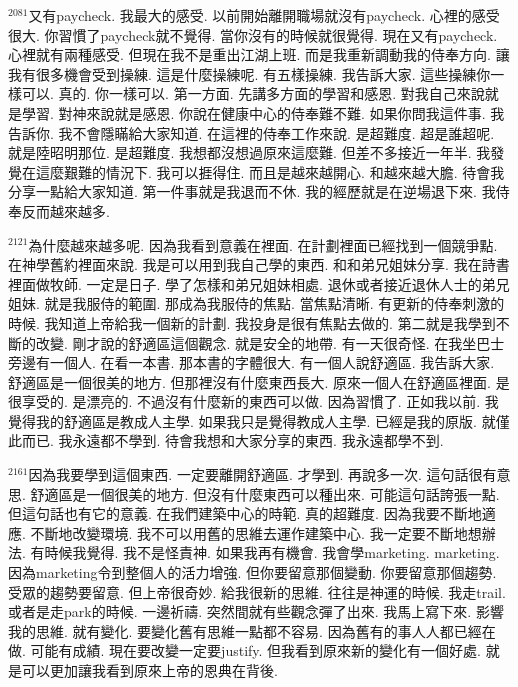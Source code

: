 \documentclass{book}
\begin{document}
$^{2081}$又有paycheck.
我最大的感受.
以前開始離開職場就沒有paycheck.
心裡的感受很大.
你習慣了paycheck就不覺得.
當你沒有的時候就很覺得.
現在又有paycheck.
心裡就有兩種感受.
但現在我不是重出江湖上班.
而是我重新調動我的侍奉方向.
讓我有很多機會受到操練.
這是什麼操練呢.
有五樣操練.
我告訴大家.
這些操練你一樣可以.
真的.
你一樣可以.
第一方面.
先講多方面的學習和感恩.
對我自己來說就是學習.
對神來說就是感恩.
你說在健康中心的侍奉難不難.
如果你問我這件事.
我告訴你.
我不會隱瞞給大家知道.
在這裡的侍奉工作來說.
是超難度.
超是誰超呢.
就是陸昭明那位.
是超難度.
我想都沒想過原來這麼難.
但差不多接近一年半.
我發覺在這麼艱難的情況下.
我可以捱得住.
而且是越來越開心.
和越來越大膽.
待會我分享一點給大家知道.
第一件事就是我退而不休.
我的經歷就是在逆場退下來.
我侍奉反而越來越多.

$^{2121}$為什麼越來越多呢.
因為我看到意義在裡面.
在計劃裡面已經找到一個競爭點.
在神學舊約裡面來說.
我是可以用到我自己學的東西.
和和弟兄姐妹分享.
我在詩書裡面做牧師.
一定是日子.
學了怎樣和弟兄姐妹相處.
退休或者接近退休人士的弟兄姐妹.
就是我服侍的範圍.
那成為我服侍的焦點.
當焦點清晰.
有更新的侍奉刺激的時候.
我知道上帝給我一個新的計劃.
我投身是很有焦點去做的.
第二就是我學到不斷的改變.
剛才說的舒適區這個觀念.
就是安全的地帶.
有一天很奇怪.
在我坐巴士旁邊有一個人.
在看一本書.
那本書的字體很大.
有一個人說舒適區.
我告訴大家.
舒適區是一個很美的地方.
但那裡沒有什麼東西長大.
原來一個人在舒適區裡面.
是很享受的.
是漂亮的.
不過沒有什麼新的東西可以做.
因為習慣了.
正如我以前.
我覺得我的舒適區是教成人主學.
如果我只是覺得教成人主學.
已經是我的原版.
就僅此而已.
我永遠都不學到.
待會我想和大家分享的東西.
我永遠都學不到.

$^{2161}$因為我要學到這個東西.
一定要離開舒適區.
才學到.
再說多一次.
這句話很有意思.
舒適區是一個很美的地方.
但沒有什麼東西可以種出來.
可能這句話誇張一點.
但這句話也有它的意義.
在我們建築中心的時範.
真的超難度.
因為我要不斷地適應.
不斷地改變環境.
我不可以用舊的思維去運作建築中心.
我一定要不斷地想辦法.
有時候我覺得.
我不是怪責神.
如果我再有機會.
我會學marketing.
marketing.
因為marketing令到整個人的活力增強.
但你要留意那個變動.
你要留意那個趨勢.
受眾的趨勢要留意.
但上帝很奇妙.
給我很新的思維.
往往是神運的時候.
我走trail.
或者是走park的時候.
一邊祈禱.
突然間就有些觀念彈了出來.
我馬上寫下來.
影響我的思維.
就有變化.
要變化舊有思維一點都不容易.
因為舊有的事人人都已經在做.
可能有成績.
現在要改變一定要justify.
但我看到原來新的變化有一個好處.
就是可以更加讓我看到原來上帝的恩典在背後.
\end{document}
